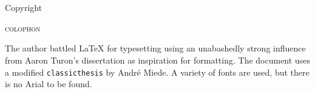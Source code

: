 \thispagestyle{empty}

\hfill

\vfill

\begingroup
\begin{wide}
    \begin{center}
        \noindent\myName \\ \textit{\myTitle} \\ %
        Copyright \textcopyright\ \myTime
    \end{center}
\end{wide}
\endgroup

\vfill

\noindent\textsc{colophon}
\medskip

\noindent The author battled \LaTeX\xspace for typesetting using an unabashedly strong influence from Aaron
Turon's dissertation
as inspiration for formatting. The document uses a modified \texttt{classicthesis} by
André Miede. A variety of fonts are used, but there is no Arial to be found.
%
%
%
%
%
